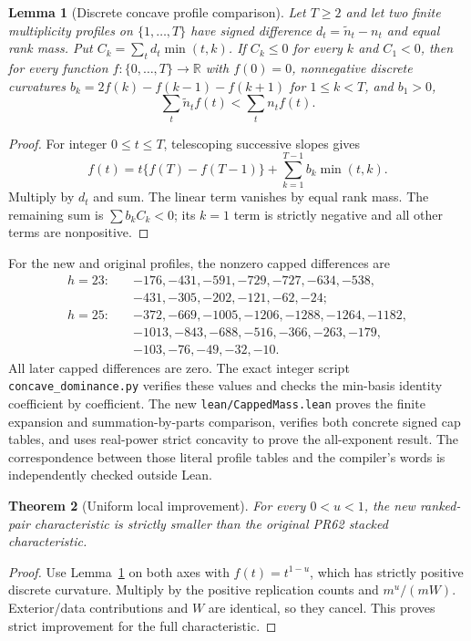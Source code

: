 \documentclass[11pt]{article}
\newtheorem{theorem}{Theorem}
\newtheorem{lemma}[theorem]{Lemma}
\newcommand{\R}{\mathbb R}
\begin{document}
\begin{lemma}[Discrete concave profile comparison]\label{lem:concave}
Let $T\ge2$ and let two finite multiplicity profiles on $\{1,\ldots,T\}$ have signed
difference $d_t=\widetilde n_t-n_t$ and equal rank mass. Put
$C_k=\sum_t d_t\min(t,k)$. If $C_k\le0$ for every $k$ and $C_1<0$,
then for every function $f:\{0,\ldots,T\}\to\R$ with $f(0)=0$, nonnegative discrete curvatures
$b_k=2f(k)-f(k-1)-f(k+1)$ for $1\le k<T$, and $b_1>0$,
\[
 \sum_t\widetilde n_t f(t)<\sum_t n_t f(t).
\]
\end{lemma}
\begin{proof}
For integer $0\le t\le T$, telescoping successive slopes gives
\[
 f(t)=t\{f(T)-f(T-1)\}
       +\sum_{k=1}^{T-1}b_k\min(t,k).
\]
Multiply by $d_t$ and sum. The linear term vanishes by equal rank mass.
The remaining sum is $\sum b_kC_k<0$; its $k=1$ term is strictly negative
and all other terms are nonpositive.
\end{proof}
For the new and original profiles, the nonzero capped differences are
\[
\begin{split}
h=23:\quad&-176,-431,-591,-729,-727,-634,-538,\\
           &-431,-305,-202,-121,-62,-24;\\
h=25:\quad&-372,-669,-1005,-1206,-1288,-1264,-1182,\\
           &-1013,-843,-688,-516,-366,-263,-179,\\
           &-103,-76,-49,-32,-10.
\end{split}
\]
All later capped differences are zero. The exact integer script
\texttt{concave\_dominance.py} verifies these values and checks the
min-basis identity coefficient by coefficient.
The new \texttt{lean/CappedMass.lean} proves the finite expansion and
summation-by-parts comparison, verifies both concrete signed cap tables,
and uses real-power strict concavity to prove the all-exponent result.
The correspondence between those literal profile tables and the compiler's
words is independently checked outside Lean.

\begin{theorem}[Uniform local improvement]
For every $0<u<1$, the new ranked-pair characteristic is strictly smaller
than the original PR62 stacked characteristic.
\end{theorem}
\begin{proof}
Use Lemma~\ref{lem:concave} on both axes with $f(t)=t^{1-u}$, which has
strictly positive discrete curvature. Multiply by the positive replication
counts and $m^u/(mW)$. Exterior/data contributions and $W$ are identical,
so they cancel. This proves strict improvement for the full characteristic.
\end{proof}
\end{document}

